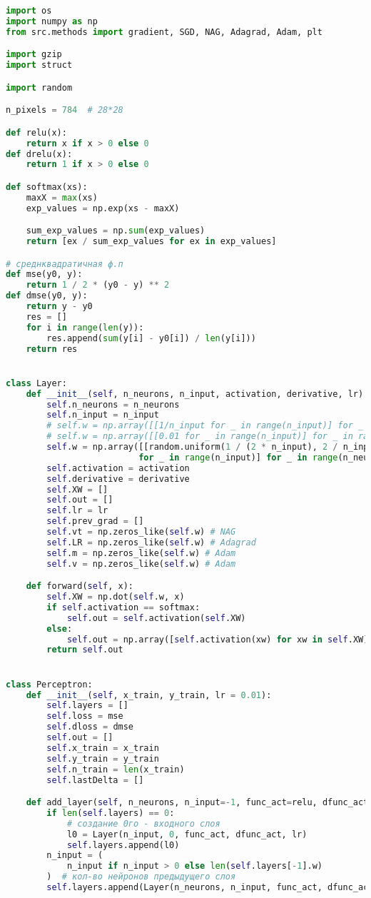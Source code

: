 \documentclass[a4paper, 14pt]{extarticle}
\begin{document}
\begin{lstlisting}[language=Python,caption={main.py},label={lst:code1}]
import os
import numpy as np
from src.methods import gradient, SGD, NAG, Adagrad, Adam, plt

import gzip
import struct

import random

n_pixels = 784  # 28*28

def relu(x):
    return x if x > 0 else 0
def drelu(x):
    return 1 if x > 0 else 0

def softmax(xs):
    maxX = max(xs)
    exp_values = np.exp(xs - maxX)

    sum_exp_values = np.sum(exp_values)
    return [ex / sum_exp_values for ex in exp_values]

# среднквадратичная ф.п
def mse(y0, y):
    return 1 / 2 * (y0 - y) ** 2
def dmse(y0, y):
    return y - y0
    res = []
    for i in range(len(y)):
        res.append(sum(y[i] - y0[i]) / len(y[i]))
    return res


class Layer:
    def __init__(self, n_neurons, n_input, activation, derivative, lr):
        self.n_neurons = n_neurons
        self.n_input = n_input
        # self.w = np.array([[1/n_input for _ in range(n_input)] for _ in range(n_neurons)])
        # self.w = np.array([[0.01 for _ in range(n_input)] for _ in range(n_neurons)])
        self.w = np.array([[random.uniform(1 / (2 * n_input), 2 / n_input)
                          for _ in range(n_input)] for _ in range(n_neurons)])
        self.activation = activation
        self.derivative = derivative
        self.XW = []
        self.out = []
        self.lr = lr
        self.prev_grad = []
        self.vt = np.zeros_like(self.w) # NAG
        self.LR = np.zeros_like(self.w) # Adagrad
        self.m = np.zeros_like(self.w) # Adam
        self.v = np.zeros_like(self.w) # Adam

    def forward(self, x):
        self.XW = np.dot(self.w, x)
        if self.activation == softmax:
            self.out = self.activation(self.XW)
        else:
            self.out = np.array([self.activation(xw) for xw in self.XW])
        return self.out


class Perceptron:
    def __init__(self, x_train, y_train, lr = 0.01):
        self.layers = []
        self.loss = mse
        self.dloss = dmse
        self.out = []
        self.x_train = x_train
        self.y_train = y_train
        self.n_train = len(x_train)
        self.lastDelta = []

    def add_layer(self, n_neurons, n_input=-1, func_act=relu, dfunc_act=drelu, lr=0.1):
        if len(self.layers) == 0:
            # создание 0го - входного слоя
            l0 = Layer(n_input, 0, func_act, dfunc_act, lr)
            self.layers.append(l0)
        n_input = (
            n_input if n_input > 0 else len(self.layers[-1].w)
        )  # кол-во нейронов предыдущего слоя
        self.layers.append(Layer(n_neurons, n_input, func_act, dfunc_act, lr))


\end{lstlisting}
\end{document}
